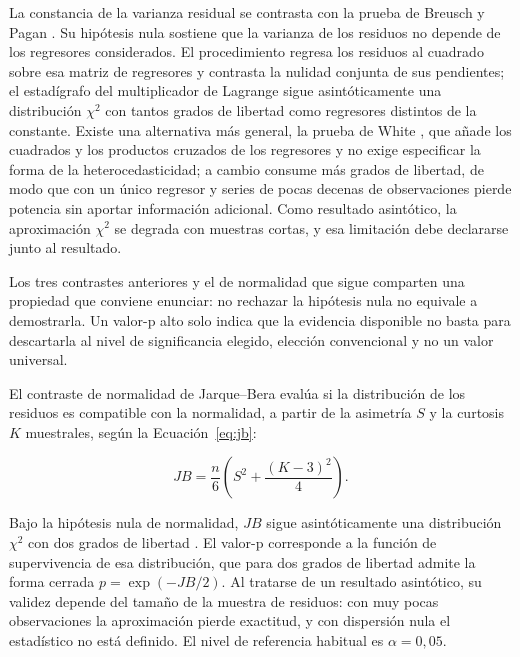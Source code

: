 \documentclass[12pt,letterpaper]{article}
\providecommand{\parencite}{\citep}
\begin{document}
La constancia de la varianza residual se contrasta con la prueba de Breusch y Pagan \parencite{breusch_pagan1979}. Su hipótesis nula sostiene que la varianza de los residuos no depende de los regresores considerados. El procedimiento regresa los residuos al cuadrado sobre esa matriz de regresores y contrasta la nulidad conjunta de sus pendientes; el estadígrafo del multiplicador de Lagrange sigue asintóticamente una distribución \(\chi^2\) con tantos grados de libertad como regresores distintos de la constante. Existe una alternativa más general, la prueba de White \parencite{white1980}, que añade los cuadrados y los productos cruzados de los regresores y no exige especificar la forma de la heterocedasticidad; a cambio consume más grados de libertad, de modo que con un único regresor y series de pocas decenas de observaciones pierde potencia sin aportar información adicional. Como resultado asintótico, la aproximación \(\chi^2\) se degrada con muestras cortas, y esa limitación debe declararse junto al resultado.

Los tres contrastes anteriores y el de normalidad que sigue comparten una propiedad que conviene enunciar: no rechazar la hipótesis nula no equivale a demostrarla. Un valor-p alto solo indica que la evidencia disponible no basta para descartarla al nivel de significancia elegido, elección convencional y no un valor universal.

El contraste de normalidad de Jarque--Bera evalúa si la distribución de los residuos es compatible con la normalidad, a partir de la asimetría $S$ y la curtosis $K$ muestrales, según la Ecuación~\ref{eq:jb}:

\begin{equation}
JB=\frac{n}{6}\left(S^2+\frac{(K-3)^2}{4}\right).
\label{eq:jb}
\end{equation}

Bajo la hipótesis nula de normalidad, $JB$ sigue asintóticamente una distribución $\chi^2$ con dos grados de libertad \parencite{jarque_bera1987}. El valor-p corresponde a la función de supervivencia de esa distribución, que para dos grados de libertad admite la forma cerrada $p=\exp(-JB/2)$. Al tratarse de un resultado asintótico, su validez depende del tamaño de la muestra de residuos: con muy pocas observaciones la aproximación pierde exactitud, y con dispersión nula el estadístico no está definido. El nivel de referencia habitual es $\alpha=0{,}05$.
\end{document}
